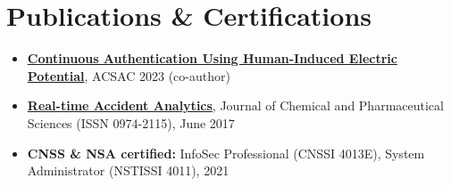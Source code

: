 \documentclass[11pt,a4paper,sans]{moderncv}
\begin{document}
\section{Publications \& Certifications}
{\begin{itemize}[label=\textbullet, itemsep=1pt]
\item \textbf{\textcolor{blue}{\href{https://doi.org/10.1145/3627106.3627124}{Continuous Authentication Using Human-Induced Electric Potential}}}, ACSAC 2023 (co-author)
\item \textbf{\textcolor{blue}{\href{https://www.academia.edu/38392049/Real_TimeAccident_Analytics}{Real-time Accident Analytics}}}, Journal of Chemical and Pharmaceutical Sciences (ISSN 0974-2115), June 2017
\item \textbf{CNSS \& NSA certified:} InfoSec Professional (CNSSI 4013E), System Administrator (NSTISSI 4011), 2021
\end{itemize}}
\end{document}
